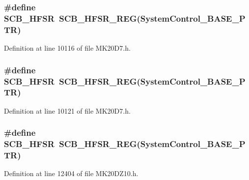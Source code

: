\subsubsection[{\texorpdfstring{S\+C\+B\+\_\+\+H\+F\+SR}{SCB_HFSR}}]{\setlength{\rightskip}{0pt plus 5cm}\#define S\+C\+B\+\_\+\+H\+F\+SR~{\bf S\+C\+B\+\_\+\+H\+F\+S\+R\+\_\+\+R\+EG}({\bf System\+Control\+\_\+\+B\+A\+S\+E\+\_\+\+P\+TR})}\hypertarget{group___s_c_b___register___accessor___macros_gaf8ffd3e54cbb7642101d979bd91cfa25}{}\label{group___s_c_b___register___accessor___macros_gaf8ffd3e54cbb7642101d979bd91cfa25}


Definition at line 10116 of file M\+K20\+D7.\+h.

\subsubsection[{\texorpdfstring{S\+C\+B\+\_\+\+H\+F\+SR}{SCB_HFSR}}]{\setlength{\rightskip}{0pt plus 5cm}\#define S\+C\+B\+\_\+\+H\+F\+SR~{\bf S\+C\+B\+\_\+\+H\+F\+S\+R\+\_\+\+R\+EG}({\bf System\+Control\+\_\+\+B\+A\+S\+E\+\_\+\+P\+TR})}\hypertarget{group___s_c_b___register___accessor___macros_gaf8ffd3e54cbb7642101d979bd91cfa25}{}\label{group___s_c_b___register___accessor___macros_gaf8ffd3e54cbb7642101d979bd91cfa25}


Definition at line 10121 of file M\+K20\+D7.\+h.

\subsubsection[{\texorpdfstring{S\+C\+B\+\_\+\+H\+F\+SR}{SCB_HFSR}}]{\setlength{\rightskip}{0pt plus 5cm}\#define S\+C\+B\+\_\+\+H\+F\+SR~{\bf S\+C\+B\+\_\+\+H\+F\+S\+R\+\_\+\+R\+EG}({\bf System\+Control\+\_\+\+B\+A\+S\+E\+\_\+\+P\+TR})}\hypertarget{group___s_c_b___register___accessor___macros_gaf8ffd3e54cbb7642101d979bd91cfa25}{}\label{group___s_c_b___register___accessor___macros_gaf8ffd3e54cbb7642101d979bd91cfa25}


Definition at line 12404 of file M\+K20\+D\+Z10.\+h.

